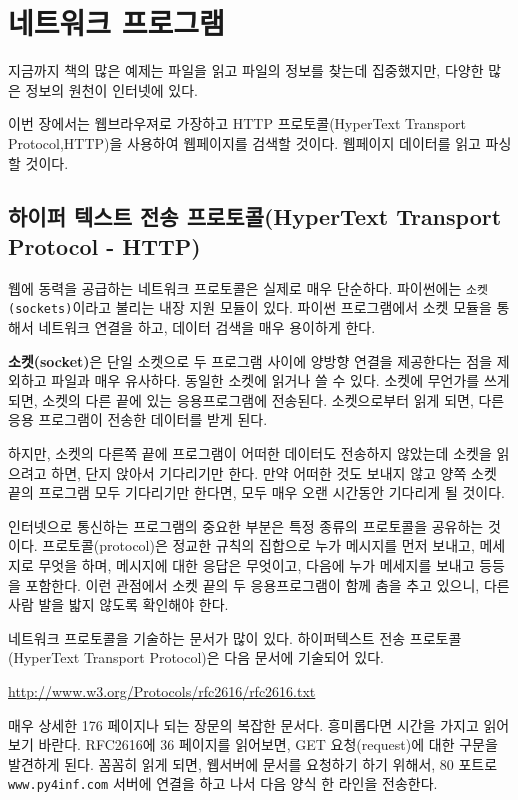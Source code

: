 
\chapter{네트워크 프로그램}
지금까지 책의 많은 예제는 파일을 읽고 파일의 정보를 찾는데 집중했지만, 
다양한 많은 정보의 원천이 인터넷에 있다.

이번 장에서는 웹브라우져로 가장하고 HTTP 프로토콜(HyperText Transport Protocol,HTTP)을 사용하여 웹페이지를 검색할 것이다. 
웹페이지 데이터를 읽고 파싱할 것이다.

\section{하이퍼 텍스트 전송 프로토콜(HyperText Transport Protocol - HTTP)}
웹에 동력을 공급하는 네트워크 프로토콜은 실제로 매우 단순하다.
파이썬에는 {\tt 소켓 (sockets)}이라고 불리는 내장 지원 모듈이 있다. 
파이썬 프로그램에서 소켓 모듈을 통해서 네트워크 연결을 하고, 데이터 검색을 매우 용이하게 한다.

{\bf 소켓(socket)}은 단일 소켓으로 두 프로그램 사이에 양방향 연결을 제공한다는 점을 제외하고 파일과 매우 유사하다.
동일한 소켓에 읽거나 쓸 수 있다. 
소켓에 무언가를 쓰게 되면, 소켓의 다른 끝에 있는 응용프로그램에 전송된다. 
소켓으로부터 읽게 되면, 다른 응용 프로그램이 전송한 데이터를 받게 된다.

하지만, 소켓의 다른쪽 끝에 프로그램이 어떠한 데이터도 전송하지 않았는데 소켓을 읽으려고 하면, 단지 앉아서 기다리기만 한다.
만약 어떠한 것도 보내지 않고 양쪽 소켓 끝의 프로그램 모두 기다리기만 한다면, 모두 매우 오랜 시간동안 기다리게 될 것이다.

인터넷으로 통신하는 프로그램의 중요한 부분은 특정 종류의 프로토콜을 공유하는 것이다.
프로토콜(protocol)은 정교한 규칙의 집합으로 누가 메시지를 먼저 보내고, 메세지로 무엇을 하며, 메시지에 대한 응답은 무엇이고, 다음에 누가 메세지를 보내고 등등을 포함한다.
이런 관점에서 소켓 끝의 두 응용프로그램이 함께 춤을 추고 있으니, 다른 사람 발을 밟지 않도록 확인해야 한다.

네트워크 프로토콜을 기술하는 문서가 많이 있다. 
하이퍼텍스트 전송 프로토콜(HyperText Transport Protocol)은 다음 문서에 기술되어 있다.

\url{http://www.w3.org/Protocols/rfc2616/rfc2616.txt}

매우 상세한 176 페이지나 되는 장문의 복잡한 문서다. 
흥미롭다면 시간을 가지고 읽어보기 바란다. 
RFC2616에 36 페이지를 읽어보면, GET 요청(request)에 대한 구문을 발견하게 된다. 
꼼꼼히 읽게 되면, 웹서버에 문서를 요청하기 하기 위해서, 80 포트로 {\tt www.py4inf.com} 서버에 
연결을 하고 나서 다음 양식 한 라인을 전송한다.

